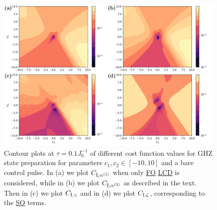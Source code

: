 \documentclass[a4paper,oneside,11pt]{book}
\newcommand{\acrref}[1]{\hyperref[acr:#1]{#1}}
\begin{document}
\begin{figure}[t!]
    \centering
    \includegraphics[width=0.9\linewidth]{images/final_plot_int_nogrape.png} \caption[Contour plots of cost function landscapes for GHZ state preparation in frustrated spin systems (integral cost function) using a bare optimisation pulse.]{Contour plots at $\tau = 0.1 J_0^{-1}$ of different cost function values for GHZ state preparation for parameters $c_1, c_2 \in [-10,10]$ and a bare control pulse. In (a) we plot $C_{\rm I, \alpha^{(1)}}$ when only \acrref{FO} \acrref{LCD} is considered, while in (b) we plot $C_{\rm I, \alpha^{(2)}}$ as described in the text. Then in (c) we plot $C_{\rm I, \gamma}$ and in (d) we plot $C_{\rm I, \zeta}$, corresponding to the \acrref{SO} terms.}\label{fig:ghz_contours_int_noGRAPE}
\end{figure}

\end{document}

